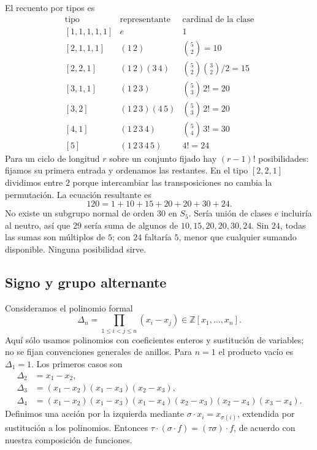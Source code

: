 \begin{ejem}\label{ejem:C9-S5}
El recuento por tipos es
\begingroup
\renewcommand{\arraystretch}{1.4}
\[
\begin{array}{c|c|c}
\text{tipo}&\text{representante}&\text{cardinal de la clase}\\\hline
{[1,1,1,1,1]}&e&1\\
{[2,1,1,1]}&(1\,2)&\binom52=10\\
{[2,2,1]}&(1\,2)(3\,4)&\binom52\binom32/2=15\\
{[3,1,1]}&(1\,2\,3)&\binom53\,2!=20\\
{[3,2]}&(1\,2\,3)(4\,5)&\binom53\,2!=20\\
{[4,1]}&(1\,2\,3\,4)&\binom54\,3!=30\\
{[5]}&(1\,2\,3\,4\,5)&4!=24
\end{array}
\]
\endgroup
Para un ciclo de longitud $r$ sobre un conjunto fijado hay $(r-1)!$ posibilidades: fijamos su primera entrada y ordenamos las restantes. En el tipo $[2,2,1]$ dividimos entre $2$ porque intercambiar las transposiciones no cambia la permutación. La ecuación resultante es
\[
120=1+10+15+20+20+30+24.
\]
No existe un subgrupo normal de orden $30$ en $S_5$. Sería unión de clases e incluiría al neutro, así que $29$ sería suma de algunos de $10,15,20,20,30,24$. Sin $24$, todas las sumas son múltiplos de $5$; con $24$ faltaría $5$, menor que cualquier sumando disponible. Ninguna posibilidad sirve.
\end{ejem}

\subsection{Signo y grupo alternante}\label{tema:9-2-0}
Consideramos el polinomio formal
\[
\Delta_n=\prod_{1\le i<j\le n}(x_i-x_j)\in\mathbb Z[x_1,\ldots,x_n].
\]
Aquí sólo usamos polinomios con coeficientes enteros y sustitución de variables; no se fijan convenciones generales de anillos. Para $n=1$ el producto vacío es $\Delta_1=1$. Los primeros casos son
\begin{align*}
\Delta_2&=x_1-x_2,\\
\Delta_3&=(x_1-x_2)(x_1-x_3)(x_2-x_3),\\
\Delta_4&=(x_1-x_2)(x_1-x_3)(x_1-x_4)
 (x_2-x_3)(x_2-x_4)(x_3-x_4).
\end{align*}
Definimos una acción por la izquierda mediante $\sigma\cdot x_i=x_{\sigma(i)}$, extendida por sustitución a los polinomios. Entonces $\tau\cdot(\sigma\cdot f)=(\tau\sigma)\cdot f$, de acuerdo con nuestra composición de funciones.

